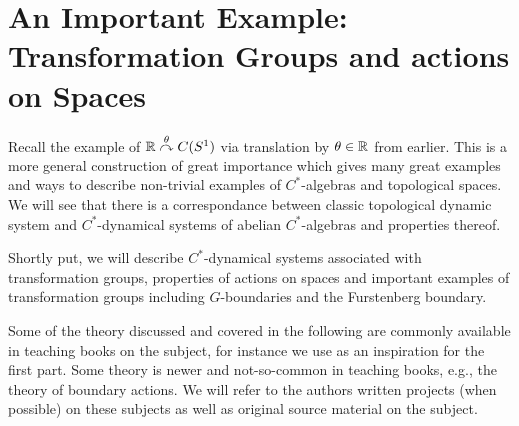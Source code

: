 \chapter{An Important Example: Transformation Groups and actions on Spaces}
Recall the example of $\mathbb{R} \stackrel{\theta}{\curvearrowright} C(S^1)$ via translation by $\theta \in \mathbb{R}$ from earlier. This is a more general construction of great importance which gives many great examples and ways to describe non-trivial examples of $C^*$-algebras and topological spaces. We will see that there is a correspondance between classic topological dynamic system and $C^*$-dynamical systems of abelian $C^*$-algebras and properties thereof. 

Shortly put, we will describe $C^*$-dynamical systems associated with transformation groups, properties of actions on spaces and important examples of transformation groups including $G$-boundaries and the Furstenberg boundary. 

Some of the theory discussed and covered in the following are commonly available in teaching books on the subject, for instance we use \cite{williamscrossed} as an inspiration for the first part. Some theory is newer and not-so-common in teaching books, e.g., the theory of boundary actions. We will refer to the authors written projects (when possible) on these subjects as well as original source material on the subject.

